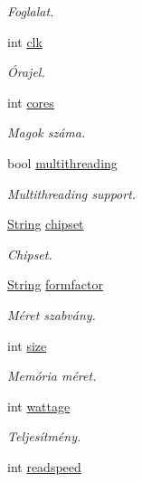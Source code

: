 \begin{DoxyCompactItemize}
\begin{DoxyCompactList}\small\item\em Foglalat. \end{DoxyCompactList}\item 
int \mbox{\hyperlink{struct_temp_input_aa76fe14a614fef6e9239ce2283d6b102}{clk}}
\begin{DoxyCompactList}\small\item\em Órajel. \end{DoxyCompactList}\item 
int \mbox{\hyperlink{struct_temp_input_a9b99532e6c984fb19c34ed943a6d5750}{cores}}
\begin{DoxyCompactList}\small\item\em Magok száma. \end{DoxyCompactList}\item 
bool \mbox{\hyperlink{struct_temp_input_ad8957d3af0ed714844abf3f37cbfc719}{multithreading}}
\begin{DoxyCompactList}\small\item\em Multithreading support. \end{DoxyCompactList}\item 
\mbox{\hyperlink{class_string}{String}} \mbox{\hyperlink{struct_temp_input_a29da394f96dae5eaa49e145207362a9c}{chipset}}
\begin{DoxyCompactList}\small\item\em Chipset. \end{DoxyCompactList}\item 
\mbox{\hyperlink{class_string}{String}} \mbox{\hyperlink{struct_temp_input_a402c6984d9e94d4c76e460d0368613f3}{formfactor}}
\begin{DoxyCompactList}\small\item\em Méret szabvány. \end{DoxyCompactList}\item 
int \mbox{\hyperlink{struct_temp_input_adfc0eb32fac7de584c3872875b452550}{size}}
\begin{DoxyCompactList}\small\item\em Memória méret. \end{DoxyCompactList}\item 
int \mbox{\hyperlink{struct_temp_input_a2764957397bba59e827c66aeb1821279}{wattage}}
\begin{DoxyCompactList}\small\item\em Teljesítmény. \end{DoxyCompactList}\item 
int \mbox{\hyperlink{struct_temp_input_a75c5e55813802a9d6af6818de81e6001}{readspeed}}

\end{DoxyCompactItemize}
